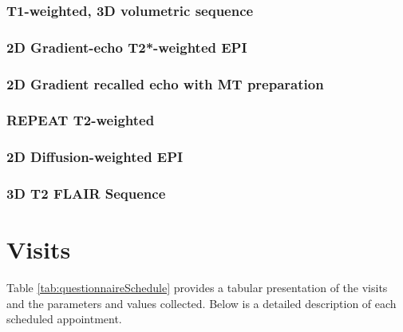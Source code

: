 \subsubsection{T1-weighted, 3D volumetric sequence}

\subsubsection{2D Gradient-echo T2*-weighted EPI}


\subsubsection{2D Gradient recalled echo with MT preparation}

\subsubsection{REPEAT T2-weighted}

\subsubsection{2D Diffusion-weighted EPI}

\subsubsection{3D T2 \ac{FLAIR} Sequence}

\section{Visits}
Table \ref{tab:questionnaireSchedule} provides a tabular presentation of the visits and the parameters and values collected. Below is a detailed description of each scheduled appointment.


